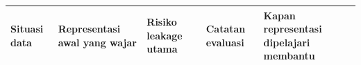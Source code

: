 {\def\LTcaptype{none} %
\par\vspace{3pt}\noindent
\begingroup\renewcommand{\arraystretch}{1.0}%
\scriptsize\linespread{1}\selectfont
\renewcommand{\_}{\textunderscore\hspace{0pt}}%
\begin{xltabular}{\linewidth}{@{}>{\raggedright\arraybackslash}p{(\tabcolsep)*} >{\raggedright\arraybackslash}p{(\tabcolsep)*} >{\raggedright\arraybackslash}p{(\tabcolsep)*} >{\raggedright\arraybackslash}p{(\tabcolsep)*} >{\raggedright\arraybackslash}p{(\tabcolsep)*}@{}}
\toprule

Situasi data
 & 
Representasi awal yang wajar
 & 
Risiko leakage utama
 & 
Catatan evaluasi
 & 
Kapan representasi dipelajari membantu
 \\
\midrule
\endhead





\end{xltabular}}
